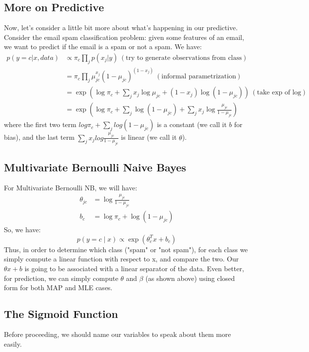 \documentclass{article}
\begin{document}
\subsection{More on Predictive}
Now, let's consider a little bit more about what's happening in our predictive. Consider the email spam classification problem: given some features of an email, we want to predict if the email is a spam or not a spam. We have:
\begin{align*}
    p(y = c | x, data) &\propto \pi_c \prod_j p(x_j|y) \> (\text{try to generate observations from class}) \\
    &= \pi_c \prod_j \mu_{jc}^{x_j} (1-\mu_{jc})^{(1-x_j)} \> (\text{informal parametrization})\\
    &= \exp(\log \pi_c + \sum_j x_j \log \mu_{jc} + (1-x_j) \log(1 - \mu_{jc})) \> (\text{take exp of log})\\
    &= \exp\left(\log \pi_c + \sum_j \log(1-\mu_{jc}) + \sum_j x_j \log\frac{\mu_{jc}}{1-\mu_{jc}}\right)
\end{align*}
where the first two term $log \pi_c + \sum_j log(1-\mu_{jc})$ is a constant (we call it $b$ for bias), and the last term $\sum_j x_j log\frac{\mu_{jc}}{1-\mu_{jc}}$ is linear (we call it $\theta$).
\subsection{Multivariate Bernoulli Naive Bayes}
For Multivariate Bernoulli NB, we will have:
\begin{align*}
    \theta_{jc} &= \log \frac{\mu_{jc}}{1 - \mu_{jc}} \\
    b_c &= \log \pi_c + \log(1- \mu_{jc})
\end{align*}
So, we have:
$$ p(y=c \mid x) \propto \exp(\theta_c^T x + b_c) $$
Thus, in order to determine which class ("spam" or "not spam"), for each class we simply compute a linear function with respect to x, and compare the two. Our $\theta x + b$ is going to be associated with a linear separator of the data.  Even better, for prediction, we can simply compute $\theta$ and $\beta$ (as shown above) using closed form for both MAP and MLE cases.

\subsection{The Sigmoid Function}
Before proceeding, we should name our variables to speak about them more easily.

\smallskip
\end{document}
